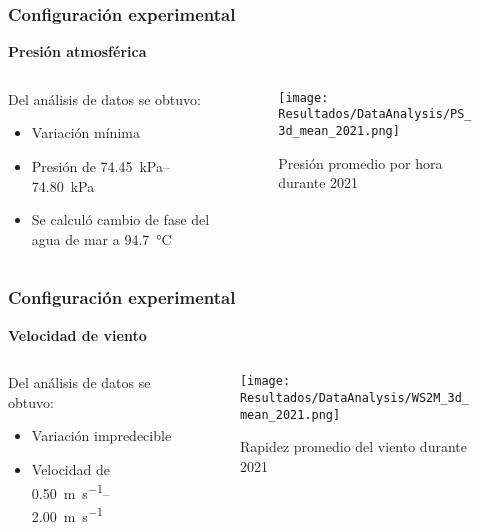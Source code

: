 	\begin{frame}
	    \frametitle{Configuración experimental}
	    \vspace*{2mm}
	    
	    \textbf{\large Presión atmosférica}\\[5mm]
	    
	    \begin{columns}
		    \begin{column}{0.5\textwidth}
		    		Del análisis de datos se obtuvo:
			    \begin{itemize}
			    		\item Variación mínima
			    		\item Presión de \qtyrange{74.45}{74.80}{\kilo\pascal}
			    		\item Se calculó cambio de fase del agua de mar a \qty{94.7}{\degreeCelsius}
			    \end{itemize}
		    \end{column}
		    \begin{column}{0.5\textwidth}
			    \centering
		    		\begin{figure}
		    			\centering
		    			\texttt{[image: Resultados/DataAnalysis/PS\_3d\_mean\_2021.png]}
		    			\caption{Presión promedio por hora durante 2021}
		    			\label{fig:PS_3d_mean_2021}
		    		\end{figure}
		    \end{column}
	    \end{columns}
	\end{frame}
	
	\begin{frame}
	    \frametitle{Configuración experimental}
	    \vspace*{2mm}
	    
	    \textbf{\large Velocidad de viento}\\[5mm]
	    \begin{columns}
		    \begin{column}{0.5\textwidth}
		    		Del análisis de datos se obtuvo:
			    \begin{itemize}
			    		\item Variación impredecible
			    		\item Velocidad de \qtyrange{0.50}{2.00}{\m\per\s}
			    \end{itemize}
		    \end{column}
		    \begin{column}{0.5\textwidth}
			    \centering
		    		\begin{figure}
		    			\centering
		    			\texttt{[image: Resultados/DataAnalysis/WS2M\_3d\_mean\_2021.png]}
		    			\caption{Rapidez promedio del viento durante 2021}
		    			\label{fig:WS2M_3d_mean_2021}
		    		\end{figure}
		    \end{column}
	    \end{columns}
	\end{frame}
	

